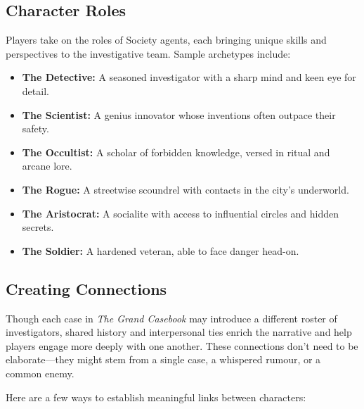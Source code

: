 \subsection{Character Roles}

Players take on the roles of Society agents, each bringing unique skills and perspectives to the investigative team. Sample archetypes include:

\begin{itemize}
    \item \textbf{The Detective:} A seasoned investigator with a sharp mind and keen eye for detail.
    \item \textbf{The Scientist:} A genius innovator whose inventions often outpace their safety.
    \item \textbf{The Occultist:} A scholar of forbidden knowledge, versed in ritual and arcane lore.
    \item \textbf{The Rogue:} A streetwise scoundrel with contacts in the city’s underworld.
    \item \textbf{The Aristocrat:} A socialite with access to influential circles and hidden secrets.
    \item \textbf{The Soldier:} A hardened veteran, able to face danger head-on.
\end{itemize}

\subsection{Creating Connections}

Though each case in \textit{The Grand Casebook} may introduce a different roster of investigators, shared history and interpersonal ties enrich the narrative and help players engage more deeply with one another. These connections don't need to be elaborate—they might stem from a single case, a whispered rumour, or a common enemy.

Here are a few ways to establish meaningful links between characters:

